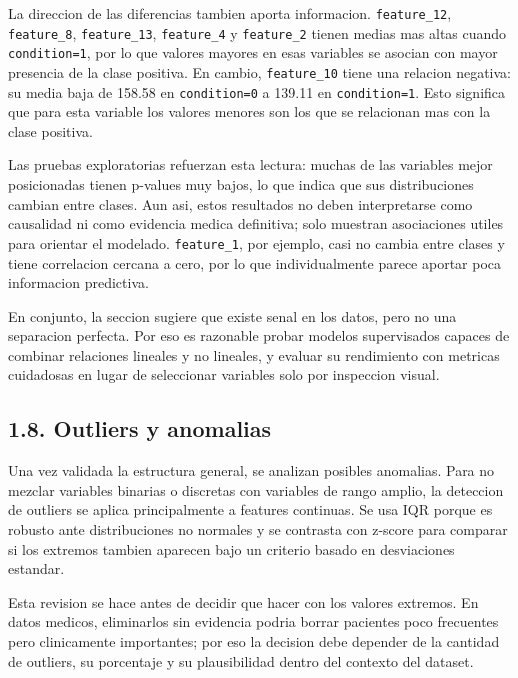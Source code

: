 \documentclass[11pt]{article}
\begin{document}
La direccion de las diferencias tambien aporta informacion.
\texttt{feature\_12}, \texttt{feature\_8}, \texttt{feature\_13},
\texttt{feature\_4} y \texttt{feature\_2} tienen medias mas altas cuando
\texttt{condition=1}, por lo que valores mayores en esas variables se
asocian con mayor presencia de la clase positiva. En cambio,
\texttt{feature\_10} tiene una relacion negativa: su media baja de
158.58 en \texttt{condition=0} a 139.11 en \texttt{condition=1}. Esto
significa que para esta variable los valores menores son los que se
relacionan mas con la clase positiva.

Las pruebas exploratorias refuerzan esta lectura: muchas de las
variables mejor posicionadas tienen p-values muy bajos, lo que indica
que sus distribuciones cambian entre clases. Aun asi, estos resultados
no deben interpretarse como causalidad ni como evidencia medica
definitiva; solo muestran asociaciones utiles para orientar el modelado.
\texttt{feature\_1}, por ejemplo, casi no cambia entre clases y tiene
correlacion cercana a cero, por lo que individualmente parece aportar
poca informacion predictiva.

En conjunto, la seccion sugiere que existe senal en los datos, pero no
una separacion perfecta. Por eso es razonable probar modelos
supervisados capaces de combinar relaciones lineales y no lineales, y
evaluar su rendimiento con metricas cuidadosas en lugar de seleccionar
variables solo por inspeccion visual.

    \subsection{1.8. Outliers y anomalias}\label{outliers-y-anomalias}

Una vez validada la estructura general, se analizan posibles anomalias.
Para no mezclar variables binarias o discretas con variables de rango
amplio, la deteccion de outliers se aplica principalmente a features
continuas. Se usa IQR porque es robusto ante distribuciones no normales
y se contrasta con z-score para comparar si los extremos tambien
aparecen bajo un criterio basado en desviaciones estandar.

Esta revision se hace antes de decidir que hacer con los valores
extremos. En datos medicos, eliminarlos sin evidencia podria borrar
pacientes poco frecuentes pero clinicamente importantes; por eso la
decision debe depender de la cantidad de outliers, su porcentaje y su
plausibilidad dentro del contexto del dataset.
\end{document}
